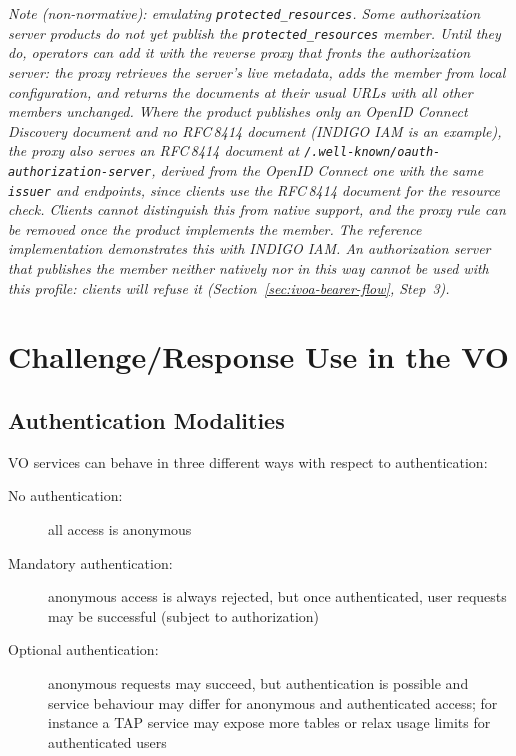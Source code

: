 \documentclass[11pt,a4paper]{ivoa}
\newcommand{\rfc}[1]{RFC\,#1}
\begin{document}
{\itshape Note (non-normative): emulating \verb|protected_resources|.
Some authorization server products do not yet publish the
\verb|protected_resources| member. Until they do, operators can add it with
the reverse proxy that fronts the authorization server: the proxy retrieves
the server's live metadata, adds the member from local configuration, and
returns the documents at their usual URLs with all other members unchanged.
Where the product publishes only an OpenID Connect Discovery document and no
\rfc{8414} document (INDIGO IAM is an example), the proxy also serves an
\rfc{8414} document at {\tt /.well-known/oauth-authorization-server},
derived from the OpenID Connect one with the same {\tt issuer} and endpoints,
since clients use the \rfc{8414} document for the resource check. Clients cannot distinguish this
from native support, and the proxy rule can be removed once the product
implements the member. The reference implementation \citep{authvo-clients}
demonstrates this with INDIGO IAM. An authorization server that publishes the
member neither natively nor in this way cannot be used with this profile:
clients will refuse it (Section~\ref{sec:ivoa-bearer-flow}, Step~3).}


\section{Challenge/Response Use in the VO}
\label{sec:cr-use}

\subsection{Authentication Modalities}
\label{sec:modalities}

VO services can behave in three different ways with respect to authentication:
\begin{description}
  \item[No authentication:]
       all access is anonymous
  \item[Mandatory authentication:]
       anonymous access is always rejected, but once authenticated,
       user requests may be successful (subject to authorization)
  \item[Optional authentication:]
       anonymous requests may succeed, but authentication is possible
       and service behaviour may differ for anonymous and authenticated access;
       for instance a TAP service may expose more tables or relax
       usage limits for authenticated users
\end{description}
\end{document}
